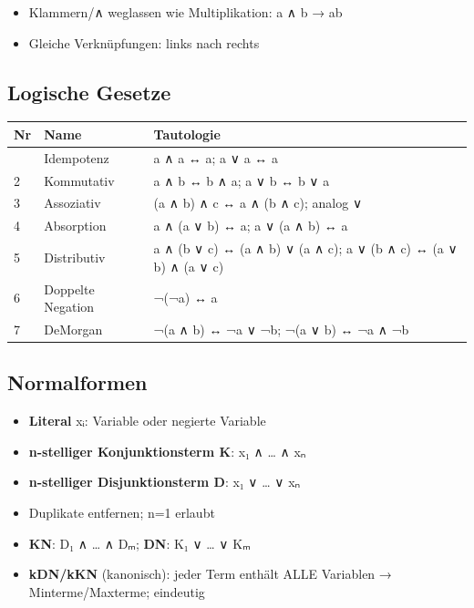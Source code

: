 \documentclass[11pt, a4paper]{article}
\begin{document}
\begin{itemize}
  \item Klammern/∧ weglassen wie Multiplikation: a ∧ b → ab
  \item Gleiche Verknüpfungen: links nach rechts
\end{itemize}


\subsection{Logische Gesetze}


{\small
\begin{tabularx}{\linewidth}{XXX}
\hline
\rowcolor{tableheadbg}
{\color{white}\textbf{Nr}} & {\color{white}\textbf{Name}} & {\color{white}\textbf{Tautologie}} \\[2pt]
\hline
\endhead
\hline
\endfoot
1 & Idempotenz & a ∧ a ↔ a; a ∨ a ↔ a \\
2 & Kommutativ & a ∧ b ↔ b ∧ a; a ∨ b ↔ b ∨ a \\
3 & Assoziativ & (a ∧ b) ∧ c ↔ a ∧ (b ∧ c); analog ∨ \\
4 & Absorption & a ∧ (a ∨ b) ↔ a; a ∨ (a ∧ b) ↔ a \\
5 & Distributiv & a ∧ (b ∨ c) ↔ (a ∧ b) ∨ (a ∧ c); a ∨ (b ∧ c) ↔ (a ∨ b) ∧ (a ∨ c) \\
6 & Doppelte Negation & ¬(¬a) ↔ a \\
7 & DeMorgan & ¬(a ∧ b) ↔ ¬a ∨ ¬b; ¬(a ∨ b) ↔ ¬a ∧ ¬b \\
\end{tabularx}
}



\subsection{Normalformen}

\begin{itemize}
  \item \textbf{Literal} xᵢ: Variable oder negierte Variable
  \item \textbf{n-stelliger Konjunktionsterm K}: x₁ ∧ … ∧ xₙ
  \item \textbf{n-stelliger Disjunktionsterm D}: x₁ ∨ … ∨ xₙ
  \item Duplikate entfernen; n=1 erlaubt
  \item \textbf{KN}: D₁ ∧ … ∧ Dₘ; \textbf{DN}: K₁ ∨ … ∨ Kₘ
  \item \textbf{kDN/kKN} (kanonisch): jeder Term enthält ALLE Variablen → Minterme/Maxterme; eindeutig
\end{itemize}
\end{document}
